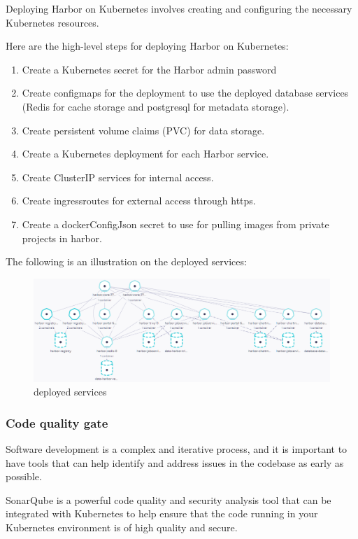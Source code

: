 
Deploying Harbor on Kubernetes involves creating and configuring the necessary Kubernetes resources. 

Here are the high-level steps for deploying Harbor on Kubernetes: 
\begin{enumerate}
\item Create a Kubernetes secret for the Harbor admin password 
\item Create configmaps for the deployment to use the deployed database services (Redis for cache storage and postgresql for metadata storage). 
\item Create persistent volume claims (PVC) for data storage. 
\item Create a Kubernetes deployment for each Harbor service. 
\item Create ClusterIP services for internal access. 
\item Create ingressroutes for external access through https. 
\item Create a dockerConfigJson secret to use for pulling images from private projects in harbor. 
\end{enumerate}

The following is an illustration on the deployed services: 
\begin{figure}[H]\centering
\includegraphics[width=1.0\textwidth,angle=00]{assets/f40.png}
\caption{deployed services}
\label{fig:Deployed services}
\end{figure}

\subsubsection{Code quality gate}

Software development is a complex and iterative process, and it is important to have tools that can help identify and address issues in the codebase as early as possible. 

SonarQube is a powerful code quality and security analysis tool that can be integrated with Kubernetes to help ensure that the code running in your Kubernetes environment is of high quality and secure. 

